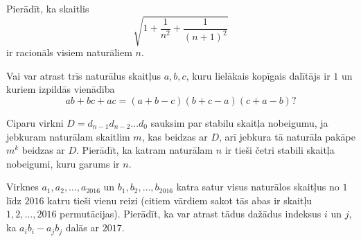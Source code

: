 \documentclass[11pt]{article}
\begin{document}
\begin{problem}[BwTst2017.13]
Pierādīt, ka skaitlis 
\[ \sqrt{1 + \frac{1}{n^2} + \frac{1}{(n+1)^2}} \]
ir racionāls visiem naturāliem $n$. 
\end{problem}

\begin{problem}[BwTst2017.14]
Vai var atrast trīs naturālus skaitļus $a,b,c$, kuru lielākais kopīgais dalītājs ir $1$
un kuriem izpildās vienādība
\[ ab + bc+ac = (a+b-c)(b+c-a)(c+a-b)? \]
\end{problem}

\begin{problem}[BwTst2017.15]
Ciparu virkni $D = d_{n-1}d_{n-2}\ldots{}d_0$ sauksim par stabilu skaitļa nobeigumu, 
ja jebkuram naturālam skaitlim $m$, kas beidzas ar $D$, arī jebkura tā naturāla pakāpe $m^k$
beidzas ar $D$. Pierādīt, ka katram naturālam $n$ ir tieši četri stabili skaitļa nobeigumi, 
kuru garums ir $n$. 
\end{problem}

\begin{problem}[BwTst2017.16]
Virknes $a_1,a_2,\ldots,a_{2016}$ un $b_1,b_2,\ldots,b_{2016}$ katra satur visus naturālos 
skaitļus no $1$ līdz $2016$ katru tieši vienu reizi 
(citiem vārdiem sakot tās abas ir skaitļu $1,2,\ldots,2016$ permutācijas). 
Pierādīt, ka var atrast tādus dažādus indeksus $i$ un $j$, ka $a_ib_i - a_jb_j$ dalās ar $2017$.
\end{problem}
\end{document}
